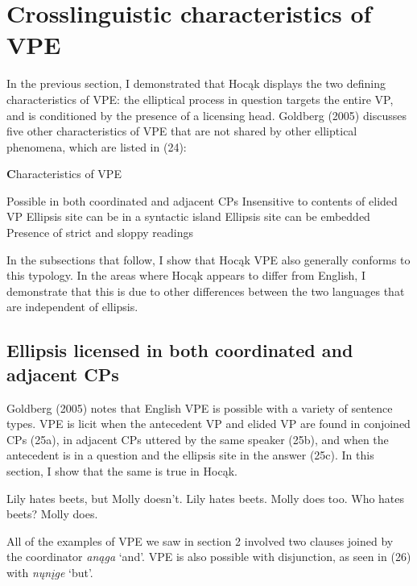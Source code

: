 \documentclass[output=paper]{LSP/langsci}
\begin{document}
\section{Crosslinguistic characteristics of VPE}

In the previous section, I demonstrated that Hoc\k{a}k displays the two defining characteristics of VPE: the elliptical process in question targets the entire VP, and is conditioned by the presence of a licensing head. Goldberg (2005) discusses five other characteristics of VPE that are not shared by other elliptical phenomena, which are listed in (24): 

\begin{exe}
\ex
{\textbf Characteristics of VPE}
\begin{xlist}
\ex
Possible in both coordinated and adjacent CPs
\ex
Insensitive to contents of elided VP
\ex
Ellipsis site can be in a syntactic island
\ex
Ellipsis site can be embedded
\ex
Presence of strict and sloppy readings
\end{xlist}
\end{exe}


In the subsections that follow, I show that Hoc\k{a}k VPE also generally conforms to this typology. In the areas where Hoc\k{a}k appears to differ from English, I demonstrate that this is due to other differences between the two languages that are independent of ellipsis.

\subsection{Ellipsis licensed in both coordinated and adjacent CPs}

Goldberg (2005) notes that English VPE is possible with a variety of sentence types. VPE is licit when the antecedent VP and elided VP are found in conjoined CPs (25a), in adjacent CPs uttered by the same speaker (25b), and when the antecedent is in a question and the ellipsis site in the answer (25c). In this section, I show that the same is true in Hoc\k{a}k.

\begin{exe}
\ex
\begin{xlist}
\ex
Lily hates beets, but Molly doesn't.
\ex
Lily hates beets. Molly does too.
\ex
Who hates beets? Molly does.
\end{xlist}
\end{exe}

All of the examples of VPE we saw in section 2 involved two clauses joined by the coordinator \emph{an\k{a}ga} `and'. VPE is also possible with disjunction, as seen in (26) with \emph{n\k{u}n\k{i}ge} `but'.
\end{document}
